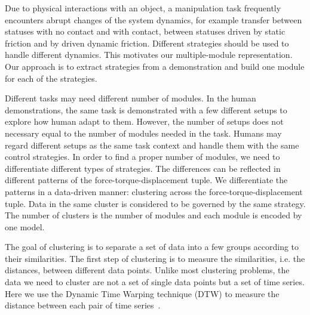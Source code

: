 Due to physical interactions with an object, a manipulation task
frequently encounters abrupt changes of the system dynamics, for
example transfer between statuses with no contact and with contact,
between statuses driven by static friction and by driven dynamic
friction. Different strategies should be used to handle different
dynamics.  This motivates our multiple-module representation. Our
approach is to extract strategies from a demonstration and build one
module for each of the
strategies. %


Different tasks may need different number of modules. In the human
demonstrations, the same task is demonstrated with a few different
setups to explore how human adapt to them. However, the number of
setups does not necessary equal to the number of modules needed in the
task. Humans may regard different setups as the same task context and
handle them with the same control
strategies. %
In order to find a proper number of modules, we need to differentiate
different types of strategies. The differences can be reflected in
different patterns of the force-torque-displacement tuple. We
differentiate the patterns in a data-driven manner: clustering across
the force-torque-displacement tuple. Data in the same cluster is
considered to be governed by the same strategy. The number of clusters
is the number of modules and each module is encoded by one model.


The goal of clustering is to separate a set of data into a few groups
according to their similarities. The first step of clustering is to
measure the similarities, i.e. the distances, between different data
points. Unlike most clustering problems, the data we need to cluster
are not a set of single data points but a set of time series. Here we
use the Dynamic Time Warping technique (DTW) to measure the distance
between each pair of time series~\citep{berndt1994using}.

